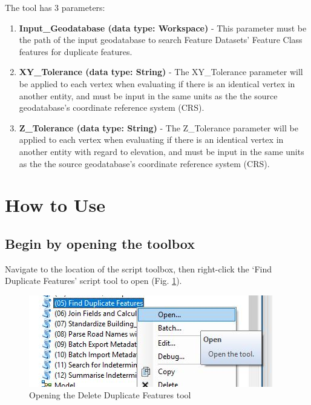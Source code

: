 \documentclass[openany]{book}
\providecommand{\tightlist}{%
  \setlength{\itemsep}{0pt}\setlength{\parskip}{0pt}}
\theoremstyle{definition}
\theoremstyle{definition}
\theoremstyle{definition}
\theoremstyle{remark}
\begin{document}
The tool has 3 parameters:

\begin{enumerate}
\def\labelenumi{\arabic{enumi}.}
\tightlist
\item
  \textbf{Input\_Geodatabase (data type: Workspace)} - This parameter
  must be the path of the input geodatabase to search Feature Datasets'
  Feature Class features for duplicate features.\\
\item
  \textbf{XY\_Tolerance (data type: String)} - The XY\_Tolerance
  parameter will be applied to each vertex when evaluating if there is
  an identical vertex in another entity, and must be input in the same
  units as the the source geodatabase's coordinate reference system
  (CRS).
\item
  \textbf{Z\_Tolerance (data type: String)} - The Z\_Tolerance parameter
  will be applied to each vertex when evaluating if there is an
  identical vertex in another entity with regard to elevation, and must
  be input in the same units as the the source geodatabase's coordinate
  reference system (CRS).
\end{enumerate}

\section{How to Use}\label{how-to-use-4}

\subsection{Begin by opening the
toolbox}\label{begin-by-opening-the-toolbox-4}

Navigate to the location of the script toolbox, then right-click the
`Find Duplicate Features' script tool to open (Fig. \ref{fig:delFopen}).

\begin{figure}[H]

{\centering \includegraphics{figures/delF-opentool} 

}

\caption{Opening the Delete Duplicate Features tool}\label{fig:delFopen}
\end{figure}
\end{document}
